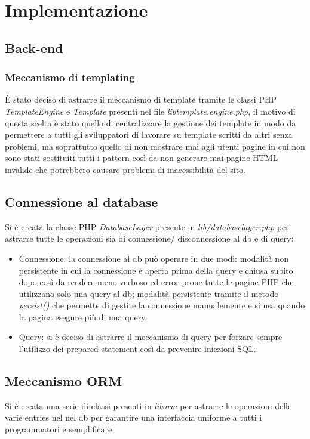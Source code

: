 \section{Implementazione}

\subsection{Back-end}

\subsubsection{Meccanismo di templating}
È stato deciso di astrarre il meccanismo di template tramite le classi PHP
\textit{TemplateEngine} e \textit{Template} presenti nel file 
\textit{lib\slshape template.engine.php}, il motivo di questa scelta è stato quello di
centralizzare la gestione dei template in modo da permettere a tutti gli
sviluppatori di lavorare su template scritti da altri senza problemi, ma
soprattutto quello di non mostrare mai agli utenti pagine in cui non sono stati
sostituiti tutti i pattern così da non generare mai pagine HTML invalide che
potrebbero causare problemi di inacessibilità del sito.

\subsection{Connessione al database}
Si è creata la classe PHP \textit{DatabaseLayer} presente in
\textit{lib/databaselayer.php} per astrarre tutte le operazioni sia di connessione/
disconnessione al db e di query:
\begin{itemize}
    \item Connessione: la connessione al db può operare in due modi: modalità non
        persistente in cui la connessione è aperta prima della query e chiusa
        subito dopo così da rendere meno verboso ed error prone tutte le pagine
        PHP che utilizzano solo una query al db; modalità persistente tramite
        il metodo \textit{persist()} che permette di gestite la connessione
        manualemente e si usa quando la pagina esegure più di una query.
    \item Query: si è deciso di astrarre il meccanismo di query per forzare sempre
        l'utilizzo dei prepared statement così da prevenire iniezioni SQL.
\end{itemize}

\subsection{Meccanismo ORM}
Si è creata una serie di classi presenti in \textit{lib\/orm\/} per
astrarre le operazioni delle varie entries nel nel db per garantire una interfaccia
uniforme a tutti i programmatori e semplificare 